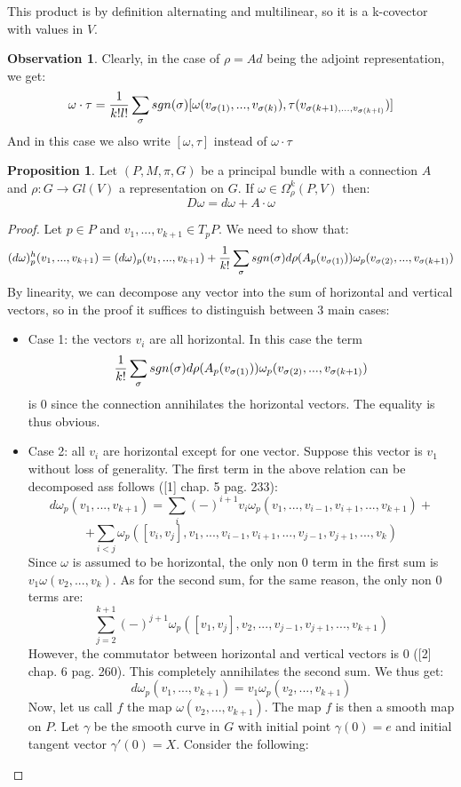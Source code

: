 \documentclass[12pt,a4paper]{report}
\theoremstyle{definition}
\theoremstyle{Theorem}
\newtheorem{Prop}[Def]{Proposition}
\theoremstyle{definition}
\theoremstyle{definition}
\newtheorem{Obs}[Def]{Observation}
\begin{document}
	This product is by definition alternating and multilinear, so it is a k-covector with values in $V$.
	\begin{Obs}
		Clearly, in the case of $\rho=Ad$ being the adjoint representation, we get:
		$$\omega\cdot \tau={1\over k!l!}\sum_\sigma sgn(\sigma)[\omega(v_{\sigma(1)},...,v_{\sigma(k)}),\tau(v_{\sigma(k+1),...,v_{\sigma(k+l)}})]$$
		And in this case we also write $[\omega,\tau]$ instead of $\omega\cdot \tau$
	\end{Obs}
	\begin{Prop}\label{Prop_6.3.4}
		Let $(P,M,\pi,G)$ be a principal bundle with a connection $A$ and $\rho:G\rightarrow Gl(V)$ a representation on $G$. If $\omega\in\Omega^k_\rho(P,V)$ then:
		$$D\omega=d\omega+A\cdot \omega$$
	\end{Prop}
	\begin{proof}
		Let $p\in P$ and $v_1,...,v_{k+1}\in T_pP$. We need to show that:
		$$(d\omega)^h_p(v_1,...,v_{k+1})=(d\omega)_p(v_1,...,v_{k+1})+{1\over k!}\sum_\sigma sgn(\sigma)d\rho(A_p(v_{\sigma(1)}))\omega_p(v_{\sigma(2)},...,v_{\sigma(k+1)})$$
		By linearity, we can decompose any vector into the sum of horizontal and vertical vectors, so in the proof it suffices to distinguish between 3 main cases:
		\begin{itemize}
			\item Case 1: the vectors $v_i$ are all horizontal. In this case the term 
			$${1\over k!}\sum_\sigma sgn(\sigma)d\rho(A_p(v_{\sigma(1)}))\omega_p(v_{\sigma(2)},...,v_{\sigma(k+1)})$$
			is 0 since the connection annihilates the horizontal vectors. The equality is thus obvious.
			\item Case 2: all $v_i$ are horizontal except for one vector. Suppose this vector is $v_1$ without loss of generality. The first term in the above relation can be decomposed ass follows ([1] chap. 5 pag. 233): 
			$$d\omega_p(v_1,...,v_{k+1})=\sum_i (-)^{i+1}v_i\omega_p(v_1,...,v_{i-1},v_{i+1},...,v_{k+1})+$$
			$$+\sum_{i<j}\omega_p([v_i,v_j],v_1,...,v_{i-1},v_{i+1},...,v_{j-1},v_{j+1},...,v_k)$$
			Since $\omega$ is assumed to be horizontal, the only non 0 term in the first sum is $v_1\omega(v_2,...,v_k)$. As for the second sum, for the same reason, the only non 0 terms are:
			$$\sum_{j=2}^{k+1}(-)^{j+1}\omega_p([v_1,v_j],v_2,...,v_{j-1},v_{j+1},...,v_{k+1})$$
			However, the commutator between horizontal and vertical vectors is 0 ([2] chap. 6 pag. 260). This completely annihilates the second sum. We thus get:
			$$d\omega_p(v_1,...,v_{k+1})=v_1\omega_p(v_2,...,v_{k+1})$$
			Now, let us call $f$ the map $\omega(v_2,...,v_{k+1})$. The map $f$ is then a smooth map on $P$. Let $\gamma$ be the smooth curve in $G$ with initial point $\gamma(0)=e$ and initial tangent vector $\gamma'(0)=X$. Consider the following:

\end{itemize}
\end{proof}
\end{document}
